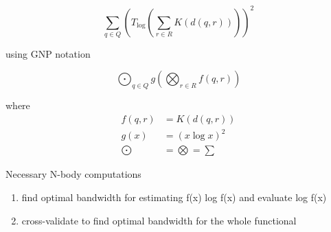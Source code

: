 \documentclass{article}
\begin{document}
\begin{displaymath}
\sum_{q \in Q} \left( T_{\log} \left( \sum_{r \in R} K(d(q,r)) \right) \right) ^2
\end{displaymath}



using GNP notation

\begin{displaymath}
\bigodot_{q \in Q} g\left(\bigotimes_{r \in R} f(q,r)\right)
\end{displaymath}

where
\begin{align*}
f(q,r) & = K(d(q,r))\\
g(x) & = (x \log x)^2\\
\bigodot & = \bigotimes = \sum
\end{align*}



Necessary N-body computations
\begin{enumerate}
\item find optimal bandwidth for estimating f(x) log f(x) and evaluate log f(x)
\item cross-validate to find optimal bandwidth for the whole functional
\end{enumerate}
\end{document}
